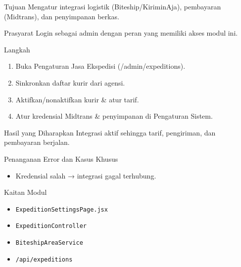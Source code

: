 
\begin{flowsection}{Tujuan}
Mengatur integrasi logistik (Biteship/KiriminAja), pembayaran (Midtrans), dan penyimpanan berkas.
\end{flowsection}

\begin{flowsection}{Prasyarat}
Login sebagai admin dengan peran yang memiliki akses modul ini.
\end{flowsection}

\begin{flowsection}{Langkah}
\begin{enumerate}
  \item Buka Pengaturan Jasa Ekspedisi (/admin/expeditions).
  \item Sinkronkan daftar kurir dari agensi.
  \item Aktifkan/nonaktifkan kurir \&  atur tarif.
  \item Atur kredensial Midtrans \&  penyimpanan di Pengaturan Sistem.
\end{enumerate}
\end{flowsection}


\begin{flowsection}{Hasil yang Diharapkan}
Integrasi aktif sehingga tarif, pengiriman, dan pembayaran berjalan.
\end{flowsection}

\begin{flowsection}{Penanganan Error dan Kasus Khusus}
\begin{itemize}
  \item Kredensial salah → integrasi gagal terhubung.
\end{itemize}
\end{flowsection}

\begin{flowsection}{Kaitan Modul}
\begin{itemize}
  \item \texttt{ExpeditionSettingsPage.jsx}
  \item \texttt{ExpeditionController}
  \item \texttt{BiteshipAreaService}
  \item \texttt{/api/expeditions}
\end{itemize}
\end{flowsection}

